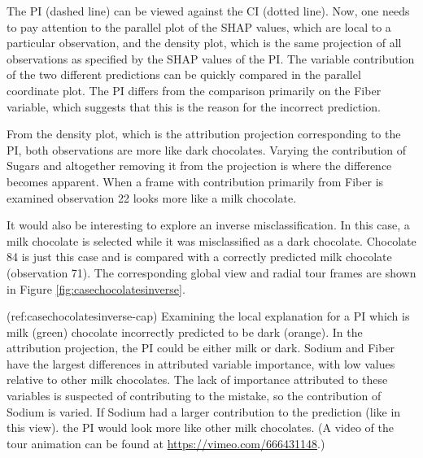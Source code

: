 \documentclass[
]{jss}
\begin{document}
The PI (dashed line) can be viewed against the CI (dotted line). Now,
one needs to pay attention to the parallel plot of the SHAP values,
which are local to a particular observation, and the density plot, which
is the same projection of all observations as specified by the SHAP
values of the PI. The variable contribution of the two different
predictions can be quickly compared in the parallel coordinate plot. The
PI differs from the comparison primarily on the Fiber variable, which
suggests that this is the reason for the incorrect prediction.

From the density plot, which is the attribution projection corresponding
to the PI, both observations are more like dark chocolates. Varying the
contribution of Sugars and altogether removing it from the projection is
where the difference becomes apparent. When a frame with contribution
primarily from Fiber is examined observation 22 looks more like a milk
chocolate.

It would also be interesting to explore an inverse misclassification. In
this case, a milk chocolate is selected while it was misclassified as a
dark chocolate. Chocolate 84 is just this case and is compared with a
correctly predicted milk chocolate (observation 71). The corresponding
global view and radial tour frames are shown in Figure
\ref{fig:casechocolatesinverse}.

(ref:casechocolatesinverse-cap) Examining the local explanation for a PI
which is milk (green) chocolate incorrectly predicted to be dark
(orange). In the attribution projection, the PI could be either milk or
dark. Sodium and Fiber have the largest differences in attributed
variable importance, with low values relative to other milk chocolates.
The lack of importance attributed to these variables is suspected of
contributing to the mistake, so the contribution of Sodium is varied. If
Sodium had a larger contribution to the prediction (like in this view).
the PI would look more like other milk chocolates. (A video of the tour
animation can be found at \url{https://vimeo.com/666431148}.)
\end{document}

